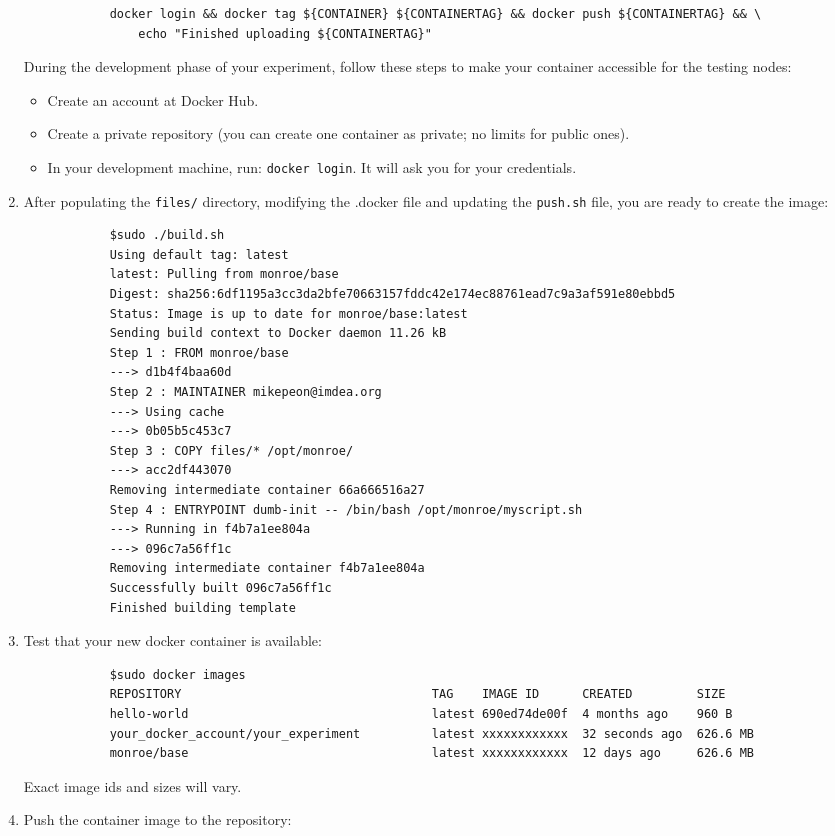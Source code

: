 \documentclass[a4paper,10pt]{article}
\newcommand{\VerbatimFont}{\footnotesize}
\newcommand{\identifier}[1]{{\texttt{\small{#1}}}}
\begin{document}
\begin{enumerate}
{\begin{verbatim}
			docker login && docker tag ${CONTAINER} ${CONTAINERTAG} && docker push ${CONTAINERTAG} && \
			    echo "Finished uploading ${CONTAINERTAG}"					
		\end{verbatim}}
		During the development phase of your experiment, follow these steps to make your container accessible for the testing nodes:
		\begin{itemize}
			\item Create an account at Docker Hub.
			\item Create a private repository (you can create one container as private; no limits for public ones).
			\item In your development machine, run: \identifier{docker login}. It will ask you for your credentials.
		\end{itemize}
	\item After populating the \identifier{files/} directory, modifying the .docker file and updating the \identifier{push.sh} file, you are ready to create the image:
		{\VerbatimFont\begin{verbatim}
			$sudo ./build.sh
			Using default tag: latest
			latest: Pulling from monroe/base
			Digest: sha256:6df1195a3cc3da2bfe70663157fddc42e174ec88761ead7c9a3af591e80ebbd5
			Status: Image is up to date for monroe/base:latest
			Sending build context to Docker daemon 11.26 kB
			Step 1 : FROM monroe/base
			---> d1b4f4baa60d
			Step 2 : MAINTAINER mikepeon@imdea.org
			---> Using cache
			---> 0b05b5c453c7
			Step 3 : COPY files/* /opt/monroe/
			---> acc2df443070
			Removing intermediate container 66a666516a27
			Step 4 : ENTRYPOINT dumb-init -- /bin/bash /opt/monroe/myscript.sh
			---> Running in f4b7a1ee804a
			---> 096c7a56ff1c
			Removing intermediate container f4b7a1ee804a
			Successfully built 096c7a56ff1c
			Finished building template
		\end{verbatim}}
	\item Test that your new docker container is available:
		{\VerbatimFont\begin{verbatim}
			$sudo docker images
			REPOSITORY                                   TAG    IMAGE ID      CREATED         SIZE
			hello-world                                  latest 690ed74de00f  4 months ago    960 B
			your_docker_account/your_experiment          latest xxxxxxxxxxxx  32 seconds ago  626.6 MB
			monroe/base                                  latest xxxxxxxxxxxx  12 days ago     626.6 MB
		\end{verbatim}}
		Exact image ids and sizes will vary.
	\item Push the container image to the repository:

\end{enumerate}
\end{document}
